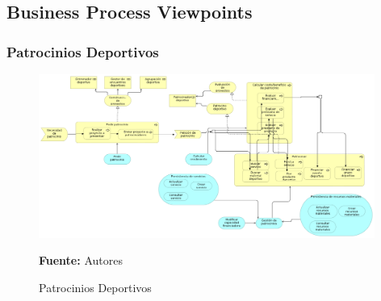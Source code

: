 \subsection{Business Process Viewpoints}

\subsubsection{Patrocinios Deportivos}

\begin{figure}[!htb]
  \begin{center}
    \includegraphics[width=11cm]{./imagenes/business_process/patrociniosdeportivos.png}
    \caption{Patrocinios Deportivos}
    \label{fig:bp_patrocinios_deportivos}
    \textbf{Fuente:}  Autores
  \end{center}
\end{figure}

